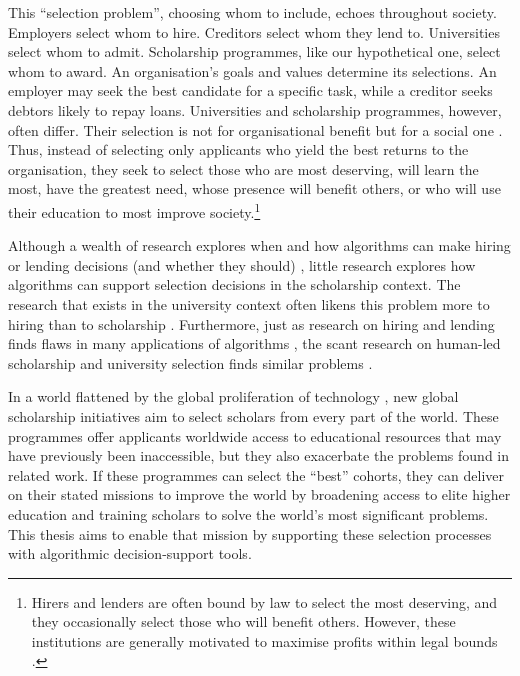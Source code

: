 This ``selection problem'', choosing whom to include, echoes throughout society. Employers select whom to hire. Creditors select whom they lend to. Universities select whom to admit. Scholarship programmes, like our hypothetical one, select whom to award. An organisation's goals and values determine its selections. An employer may seek the best candidate for a specific task, while a creditor seeks debtors likely to repay loans. Universities and scholarship programmes, however, often differ. Their selection is not for organisational benefit but for a social one \cite{Warikoo_2019}. Thus, instead of selecting only applicants who yield the best returns to the organisation, they seek to select those who are most deserving, will learn the most, have the greatest need, whose presence will benefit others, or who will use their education to most improve society.\footnote{Hirers and lenders are often bound by law to select the most deserving, and they occasionally select those who will benefit others. However, these institutions are generally motivated to maximise profits within legal bounds \cite{schmidt1998validity}.}

Although a wealth of research explores when and how algorithms can make hiring or lending decisions (and whether they should) \cite{schmidt1998validity,schumann2017diverse,raghavan2020mitigating,horodyski_applicants_2023,Leung_Zhang_Jibuti_Zhao_Klein_Pierce_Robert_Zhu_2020}, little research explores how algorithms can support selection decisions in the scholarship context. The research that exists in the university context often likens this problem more to hiring than to scholarship \cite{schumann2017diverse,Steel_Multiple_2018,ijcai2023p819}. Furthermore, just as research on hiring and lending finds flaws in many applications of algorithms \cite{raghavan2020mitigating,horodyski_applicants_2023,Peng_Nushi_Kıcıman_Inkpen_Suri_Kamar_2019}, the scant research on human-led scholarship and university selection finds similar problems \cite{schumann2017diverse}.

In a world flattened by the global proliferation of technology \cite{Friedman_2005}, new global scholarship initiatives aim to select scholars from every part of the world. These programmes offer applicants worldwide access to educational resources that may have previously been inaccessible, but they also exacerbate the problems found in related work. If these programmes can select the ``best'' cohorts, they can deliver on their stated missions to improve the world by broadening access to elite higher education and training scholars to solve the world's most significant problems. This thesis aims to enable that mission by supporting these selection processes with algorithmic decision-support tools.

